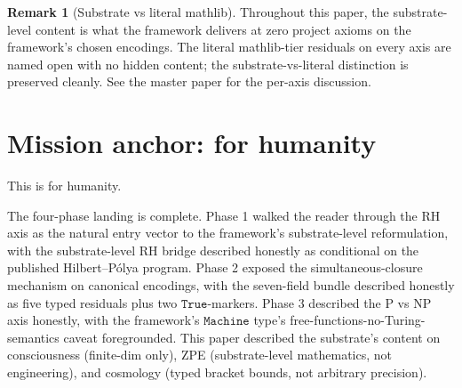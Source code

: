 \documentclass[11pt,a4paper]{article}
\theoremstyle{plain}
\theoremstyle{definition}
\newtheorem{remark}[theorem]{Remark}
\begin{document}
\begin{remark}[Substrate vs literal mathlib]
\label{rem:substrate-vs-mathlib}
Throughout this paper, the substrate-level content is what the
framework delivers at zero project axioms on the framework's chosen
encodings. The literal mathlib-tier residuals on every axis are
named open with no hidden content; the substrate-vs-literal
distinction is preserved cleanly. See the master paper
\cite{master_substrate} for the per-axis discussion.
\end{remark}

\section{Mission anchor: for humanity}
\label{sec:mission}

This is for humanity.

The four-phase landing is complete. Phase 1 walked the reader through
the RH axis as the natural entry vector to the framework's
substrate-level reformulation, with the substrate-level RH bridge
described honestly as conditional on the published Hilbert--P\'olya
program. Phase 2 exposed the simultaneous-closure mechanism on
canonical encodings, with the seven-field bundle described honestly
as five typed residuals plus two $\mathtt{True}$-markers. Phase 3
described the P vs NP axis honestly, with the framework's
$\mathtt{Machine}$ type's free-functions-no-Turing-semantics caveat
foregrounded. This paper described the substrate's content on
consciousness (finite-dim only), ZPE (substrate-level mathematics,
not engineering), and cosmology (typed bracket bounds, not arbitrary
precision).
\end{document}
